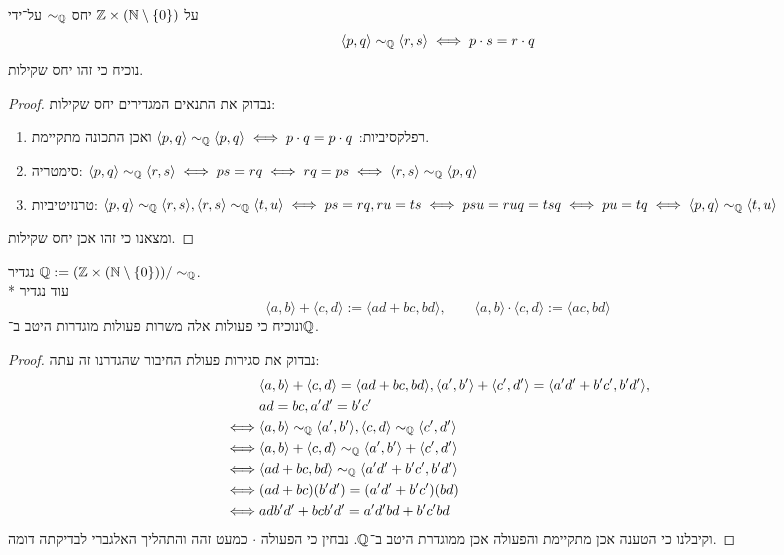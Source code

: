 \Question{}
\Subquestion{}
על $\mathbb{Z} \times (\mathbb{N} \setminus \{0\})$ יחס $\sim_{\mathbb{Q}}$ על־ידי
\[
	\langle p, q \rangle \sim_{\mathbb{Q}} \langle r, s \rangle \iff p \cdot s = r \cdot q
\]
נוכיח כי זהו יחס שקילות.
\begin{proof}
	נבדוק את התנאים המגדירים יחס שקילות:
	\begin{enumerate}
		\item רפלקסיביות: $\langle p, q \rangle \sim_{\mathbb{Q}} \langle p, q \rangle \iff p \cdot q = p \cdot q$ ואכן התכונה מתקיימת.
		\item סימטריה: $\langle p, q \rangle \sim_{\mathbb{Q}} \langle r, s \rangle \iff ps = rq \iff rq = ps \iff \langle r, s \rangle \sim_{\mathbb{Q}} \langle p, q \rangle$
		\item טרנזיטיביות: $\langle p, q \rangle \sim_{\mathbb{Q}} \langle r, s \rangle, \langle r, s \rangle \sim_{\mathbb{Q}} \langle t, u \rangle
			\iff ps = rq, ru = ts \iff psu = ruq = tsq \iff pu = tq \iff \langle p, q \rangle \sim_{\mathbb{Q}} \langle t, u \rangle$
	\end{enumerate}
	ומצאנו כי זהו אכן יחס שקילות.
\end{proof}

\Subquestion{}
נגדיר $\mathbb{Q} := (\mathbb{Z} \times (\mathbb{N} \setminus\{0\}))/\sim_{\mathbb{Q}}$. \\*
עוד נגדיר
\[
	\langle a, b \rangle + \langle c, d\rangle := \langle ad + bc, bd \rangle,
	\qquad
	\langle a, b \rangle \cdot \langle c, d\rangle := \langle ac, bd \rangle
\]
ונוכיח כי פעולות אלה משרות פעולות מוגדרות היטב ב־$\mathbb{Q}$.
\begin{proof}
	נבדוק את סגירות פעולת החיבור שהגדרנו זה עתה:
	\begin{align*}
		& \langle a, b \rangle + \langle c, d\rangle = \langle ad + bc, bd \rangle, \langle a', b' \rangle + \langle c', d'\rangle = \langle a' d' + b' c', b' d' \rangle, \\
		& a d = b c, a' d' = b' c' \\
		\iff &
		\langle a, b \rangle \sim_{\mathbb{Q}} \langle a', b' \rangle, \langle c, d\rangle \sim_{\mathbb{Q}} \langle c', d'\rangle \\
		\iff &
		\langle a, b \rangle + \langle c, d\rangle \sim_{\mathbb{Q}} \langle a', b' \rangle + \langle c', d'\rangle \\
		\iff &
		\langle ad + bc, bd \rangle \sim_{\mathbb{Q}} \langle a' d' + b' c', b' d' \rangle \\
		\iff &
		(ad + bc)(b' d') = (a' d' + b' c')(bd) \\
		\iff &
		ad b' d'+ bc b' d' = a' d' b d + b' c' bd \\
	\end{align*}
	וקיבלנו כי הטענה אכן מתקיימת והפעולה אכן ממוגדרת היטב ב־$\mathbb{Q}$. נבחין כי הפעולה $\cdot$ כמעט זהה והתהליך האלגברי לבדיקתה דומה.
\end{proof}

